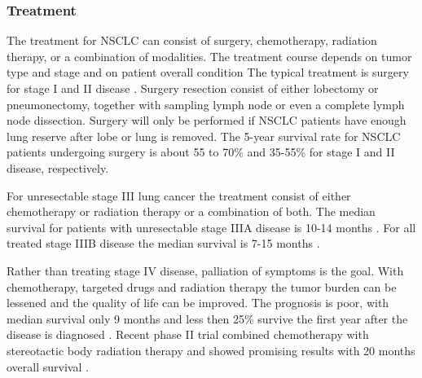 \documentclass[type=dr, dr=rernat, accentcolor=tud7b,colorbacktitle, bigchapter, openright, twoside, 12pt ]{tudthesis}
\begin{document}
\subsubsection{Treatment}

The treatment for NSCLC can consist of surgery, chemotherapy, radiation therapy, or a combination of modalities. The treatment course depends on tumor type and stage and on patient overall condition
The typical treatment is surgery for stage I and II disease \cite{Tsao2008}. Surgery resection consist of either lobectomy or pneumonectomy, together with sampling lymph node or even a complete lymph node
dissection. Surgery will only be performed if NSCLC patients have enough lung reserve after lobe or lung is removed. The 5-year survival rate for NSCLC patients undergoing surgery is about 55 to 70\% 
and 35-55\% for stage I and II disease, respectively.

For unresectable stage III lung cancer the treatment consist of either chemotherapy or radiation therapy or a combination of both. The median survival for patients with unresectable stage IIIA disease is 10-14 months \cite{Tsao2008}.
For all treated stage IIIB disease the median survival is 7-15 months \cite{Srisam2005}.

Rather than treating stage IV disease, palliation of symptoms is the goal. With chemotherapy, targeted drugs and radiation therapy the tumor burden can be lessened and the quality of life can be improved. The prognosis is poor, with
median survival only 9 months and less then 25\% survive the first year after the disease is diagnosed \cite{Tsao2008}. Recent phase II trial combined chemotherapy with stereotactic body radiation therapy and 
showed promising results with 20 months overall survival \cite{Iyengar2014}.



{}
% 
\end{document}
